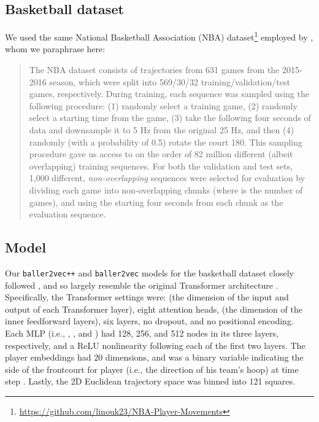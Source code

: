 \documentclass{article}
\newcommand{\btv}{\texttt{baller2vec}}
\newcommand{\btvpp}{\texttt{baller2vec++}}
\begin{document}
\subsection{Basketball dataset}

We used the same National Basketball Association (NBA) dataset\footnote{\url{https://github.com/linouk23/NBA-Player-Movements}} employed by \citet{alcorn2021baller2vec}, whom we paraphrase here:

\begin{quote}
    The NBA dataset consists of trajectories from 631 games from the 2015-2016 season, which were split into 569/30/32 training/validation/test games, respectively.
    During training, each sequence was sampled using the following procedure: (1) randomly select a training game, (2) randomly select a starting time from the game, (3) take the following four seconds of data and downsample it to 5 Hz from the original 25 Hz, and then (4) randomly (with a probability of 0.5) rotate the court 180\degree.
    This sampling procedure gave us access to on the order of 82 million different (albeit overlapping) training sequences.
    For both the validation and test sets, 1,000 different, \textit{non-overlapping} sequences were selected for evaluation by dividing each game into  non-overlapping chunks (where  is the number of games), and using the starting four seconds from each chunk as the evaluation sequence.
\end{quote}

\subsection{Model}\label{sec:model}

Our \btvpp{} and \btv{} models for the basketball dataset closely followed \cite{alcorn2021baller2vec}, and so largely resemble the original Transformer architecture \cite{vaswani2017attention}.
Specifically, the Transformer settings were:  (the dimension of the input and output of each Transformer layer), eight attention heads,  (the dimension of the inner feedforward layers), six layers, no dropout, and no positional encoding.
Each MLP (i.e., , , and ) had 128, 256, and 512 nodes in its three layers, respectively, and a ReLU nonlinearity following each of the first two layers.
The player embeddings \cite{alcorn20182vec} had 20 dimensions, and  was a binary variable indicating the side of the frontcourt for player  (i.e., the direction of his team's hoop) at time step .
Lastly, the  2D Euclidean trajectory space was binned into 121  squares.
\end{document}
